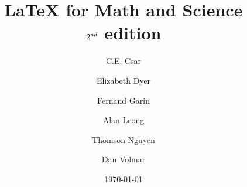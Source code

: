 \documentclass[oneside]{memoir}
\begin{document}
\garamond
\title{\LaTeX{} for Math and Science\\ \small{$2^{{\textrm nd}}$ edition}} 
\author{C.E. Csar \and
  Elizabeth Dyer \and Fernand Garin \and Alan Leong \and Thomson
  Nguyen \and Dan Volmar} 
\date{\today}
\normalfont
\maketitle
\newpage
\tableofcontents
\newpage
\listoftables
\newpage
\mainmatter











\appendix
\appendixpage






\backmatter
\end{document}
